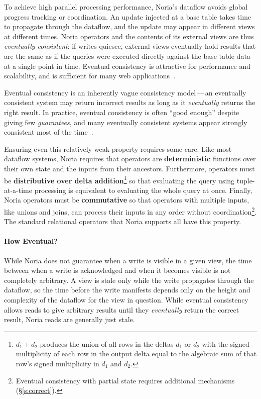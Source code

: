 To achieve high parallel processing performance, Noria's dataflow avoids
global progress tracking or coordination. An update injected at a base table
takes time to propagate through the dataflow, and the update may appear in
different views at different times. Noria operators and the contents of its
external views are thus \emph{eventually-consistent}: if writes quiesce,
external views eventually hold results that are the same as if the queries were
executed directly against the base table data at a single point in time.
Eventual consistency is attractive for performance and scalability, and is
sufficient for many web applications~\cite{eventually-consistent,
facebook-memcache, pnuts}.


Eventual consistency is an inherently vague consistency model\,---\,an
eventually consistent system may return incorrect results as long as it
\emph{eventually} returns the right result. In practice, eventual consistency is
often ``good enough'' despite giving few \emph{guarantees}, and many eventually
consistent systems appear strongly consistent most of the time~\cite{eventual}.

Ensuring even this relatively weak property requires some care. Like most
dataflow systems, Noria requires that operators are \textbf{deterministic}
functions over their own state and the inputs from their ancestors. Furthermore,
operators must be \textbf{distributive over delta addition}\footnote{$d_1 + d_2$
produces the union of all rows in the deltas $d_1$ or $d_2$ with the signed
multiplicity of each row in the output delta equal to the algebraic sum of that
row's signed multiplicity in $d_1$ and $d_2$.} so that evaluating the query
using tuple-at-a-time processing is equivalent to evaluating the whole query at
once. Finally, Noria operators must be \textbf{commutative} so that operators
with multiple inputs, like unions and joins, can process their inputs in any
order without coordination\footnote{Eventual consistency with partial state
requires additional mechanisms (\S\ref{s:correct}).}. The standard relational
operators that Noria supports all have this property.

\paragraph{How Eventual?}
While Noria does not guarantee when a write is visible in a given view, the time
between when a write is acknowledged and when it becomes visible is not
completely arbitrary. A view is stale only while the write propagates through
the dataflow, so the time before the write manifests depends only on the height
and complexity of the dataflow for the view in question. While eventual
consistency allows reads to give arbitrary results until they \emph{eventually}
return the correct result, Noria reads are generally just stale.

